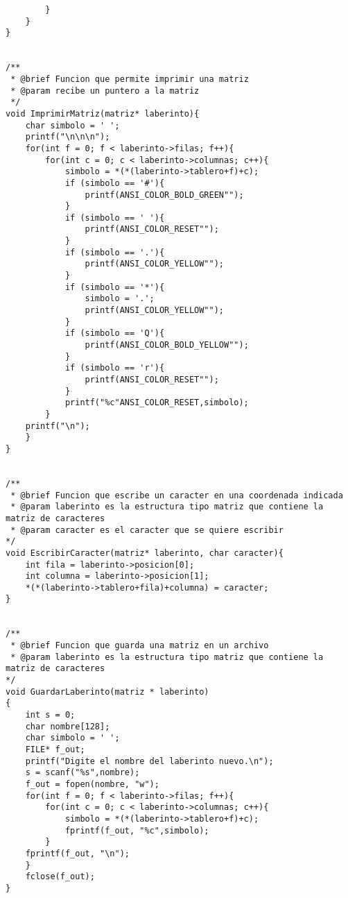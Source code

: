 \begin{verbatim}
        }
    }   
}


/**
 * @brief Funcion que permite imprimir una matriz
 * @param recibe un puntero a la matriz
 */
void ImprimirMatriz(matriz* laberinto){
    char simbolo = ' ';
    printf("\n\n\n");
    for(int f = 0; f < laberinto->filas; f++){
        for(int c = 0; c < laberinto->columnas; c++){
            simbolo = *(*(laberinto->tablero+f)+c);
            if (simbolo == '#'){
                printf(ANSI_COLOR_BOLD_GREEN"");
            }
            if (simbolo == ' '){
                printf(ANSI_COLOR_RESET"");
            }
            if (simbolo == '.'){
                printf(ANSI_COLOR_YELLOW"");
            }
            if (simbolo == '*'){
                simbolo = '.';
                printf(ANSI_COLOR_YELLOW"");
            }
            if (simbolo == 'Q'){
                printf(ANSI_COLOR_BOLD_YELLOW"");
            }
            if (simbolo == 'r'){
                printf(ANSI_COLOR_RESET"");
            }
            printf("%c"ANSI_COLOR_RESET,simbolo);
        }
    printf("\n"); 
    }   
}


/**
 * @brief Funcion que escribe un caracter en una coordenada indicada 
 * @param laberinto es la estructura tipo matriz que contiene la matriz de caracteres
 * @param caracter es el caracter que se quiere escribir
*/
void EscribirCaracter(matriz* laberinto, char caracter){
    int fila = laberinto->posicion[0];
    int columna = laberinto->posicion[1];
    *(*(laberinto->tablero+fila)+columna) = caracter;
}


/**
 * @brief Funcion que guarda una matriz en un archivo 
 * @param laberinto es la estructura tipo matriz que contiene la matriz de caracteres
*/
void GuardarLaberinto(matriz * laberinto)
{
    int s = 0;
    char nombre[128];
    char simbolo = ' ';
    FILE* f_out;
    printf("Digite el nombre del laberinto nuevo.\n");
    s = scanf("%s",nombre);
    f_out = fopen(nombre, "w");
    for(int f = 0; f < laberinto->filas; f++){
        for(int c = 0; c < laberinto->columnas; c++){
            simbolo = *(*(laberinto->tablero+f)+c);
            fprintf(f_out, "%c",simbolo);
        }
    fprintf(f_out, "\n");
    }
    fclose(f_out);
}



\end{verbatim}

